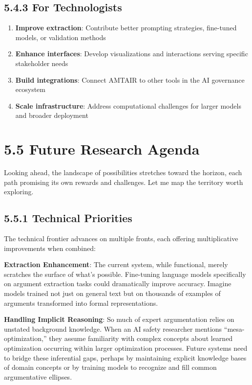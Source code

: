 \documentclass[
  11pt,
  letterpaper,
]{book}
\providecommand{\tightlist}{%
  \setlength{\itemsep}{0pt}\setlength{\parskip}{0pt}}
\begin{document}
\subsection{5.4.3 For
Technologists}\label{sec-technologist-recommendations}

\begin{enumerate}
\def\labelenumi{\arabic{enumi}.}
\tightlist
\item
  \textbf{Improve extraction}: Contribute better prompting strategies,
  fine-tuned models, or validation methods
\item
  \textbf{Enhance interfaces}: Develop visualizations and interactions
  serving specific stakeholder needs
\item
  \textbf{Build integrations}: Connect AMTAIR to other tools in the AI
  governance ecosystem
\item
  \textbf{Scale infrastructure}: Address computational challenges for
  larger models and broader deployment
\end{enumerate}

\section{5.5 Future Research Agenda}\label{sec-future-research-agenda}

Looking ahead, the landscape of possibilities stretches toward the
horizon, each path promising its own rewards and challenges. Let me map
the territory worth exploring.

\subsection{5.5.1 Technical Priorities}\label{sec-technical-priorities}

The technical frontier advances on multiple fronts, each offering
multiplicative improvements when combined:

\textbf{Extraction Enhancement}: The current system, while functional,
merely scratches the surface of what's possible. Fine-tuning language
models specifically on argument extraction tasks could dramatically
improve accuracy. Imagine models trained not just on general text but on
thousands of examples of arguments transformed into formal
representations.

\textbf{Handling Implicit Reasoning}: So much of expert argumentation
relies on unstated background knowledge. When an AI safety researcher
mentions ``mesa-optimization,'' they assume familiarity with complex
concepts about learned optimization occurring within larger optimization
processes. Future systems need to bridge these inferential gaps, perhaps
by maintaining explicit knowledge bases of domain concepts or by
training models to recognize and fill common argumentative ellipses.
\end{document}
